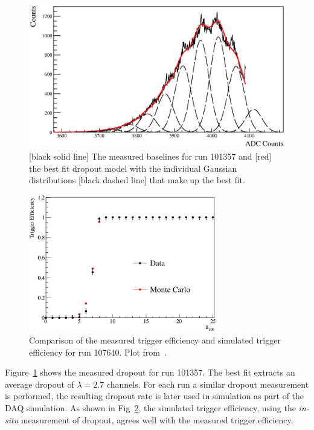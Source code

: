 \begin{figure}[htbp]
    \centering
    \includegraphics[width=1\textwidth]{dropout_example}
    \caption[Dropout Fit Example]{[black solid line] The measured baselines
    for run 101357 and [red] the best fit dropout model with the
    individual Gaussian distributions [black dashed line] that make up the best fit.}
\label{fig:dropoutexample}
\end{figure}

\begin{figure}[htbp]
    \centering
    \includegraphics[width=0.73\textwidth]{trigger_efficiecy}
    \caption[Trigger Efficiency] {Comparison of the measured trigger efficiency
    and simulated trigger efficiency for run 107640. Plot from~\citep{tanner_triggeff}.}
\label{fig:trigeff}
\end{figure}

Figure~\ref{fig:dropoutexample} shows the measured dropout for run 101357.
The best fit extracts an average dropout of $\lambda=2.7$ channels.
For each run a similar dropout measurement is performed, the resulting dropout
rate is later used in simulation as part of the DAQ simulation.
As shown in Fig~\ref{fig:trigeff}, the  simulated trigger efficiency, using the
\textit{in-situ} measurement of dropout, agrees well with the measured trigger
efficiency.

